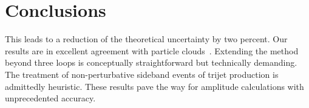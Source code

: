 \section{Conclusions}\label{sec:conclusions}

This leads to a reduction of the theoretical uncertainty by two percent.
Our results are in excellent agreement with particle
clouds~\cite{TPC:0003-One-Thousand-Results-in-Perturbative-QCD-September-24-2026}.
Extending the method beyond three loops is conceptually straightforward
but technically demanding. The treatment of non-perturbative sideband
events of trijet production is admittedly heuristic. These results pave
the way for amplitude calculations with unprecedented accuracy.

